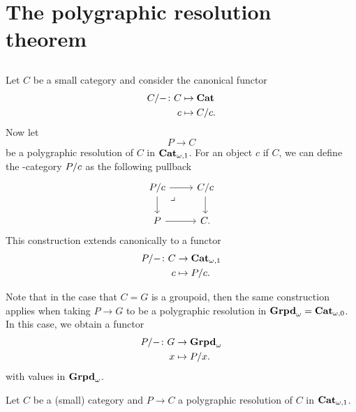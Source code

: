 \section{The polygraphic resolution theorem}

\subsection{}
\begin{paragr}
  Let $C$ be a small category and consider the canonical functor
  \[
    \begin{aligned}
      C/- \colon C &\mapsto \mathbf{Cat} \\
      c &\mapsto C/c.
    \end{aligned}
  \]
  Now let
  \[
    P \to C
  \]
  be a polygraphic resolution of $C$ in $\mathbf{Cat}_{\omega,1}$. For an object $c$
  if $C$, we can define the \nbd-category $P/c$
  as the following pullback
  \[
    \begin{tikzcd}
      \tr{P}{c} \ar[d] \ar[r] & \tr{C}{c} \ar[d] \\
      P \ar[r] & C.
      \ar[from=1-1,to=2-2,phantom,"\lrcorner",very near start]
    \end{tikzcd}
  \]
  This construction extends canonically to a functor
  \[
    \begin{aligned}
      P/- \colon C &\to \mathbf{Cat}_{\omega,1} \\
      c &\mapsto P/c.
    \end{aligned}
  \]

  Note that in the case that $C=G$ is a groupoid, then the same
  construction applies when taking $P \to G$ to be a polygraphic
  resolution in $\mathbf{Grpd}_{\omega}=\mathbf{Cat}_{\omega,0}$. In this case, we obtain a functor
  \[
       \begin{aligned}
      P/- \colon G &\to \mathbf{Grpd}_{\omega} \\
      x &\mapsto P/x.
    \end{aligned} 
  \]
  with values in $\mathbf{Grpd}_{\omega}$.
\end{paragr}
\begin{theorem}
  Let $C$ be a (small) category and $P \to C$ a polygraphic resolution
  of $C$ in $\mathbf{Cat}_{\omega,1}$. 
\end{theorem}